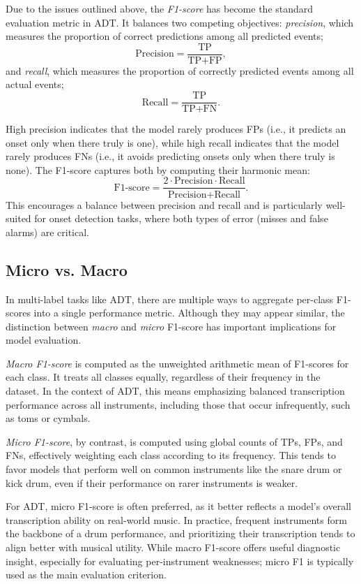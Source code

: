 Due to the issues outlined above, the \textit{F1-score} has become the standard evaluation metric in \gls{ADT}. It balances two competing objectives: \textit{precision}, which measures the proportion of correct predictions among all predicted events; \[ \text{Precision} = \frac{\text{TP}}{\text{TP} + \text{FP}},\] and \textit{recall}, which measures the proportion of correctly predicted events among all actual events; \[ \text{Recall} = \frac{\text{TP}}{\text{TP} + \text{FN}}. \]

High precision indicates that the model rarely produces \glspl{FP} (i.e., it predicts an onset only when there truly is one), while high recall indicates that the model rarely produces \glspl{FN} (i.e., it avoids predicting onsets only when there truly is none). The F1-score captures both by computing their harmonic mean: \[ \text{F1-score} = \frac{2 \cdot \text{Precision} \cdot \text{Recall}}{\text{Precision} + \text{Recall}}. \] This encourages a balance between precision and recall and is particularly well-suited for onset detection tasks, where both types of error (misses and false alarms) are critical.

\subsection{Micro vs. Macro}

In multi-label tasks like \gls{ADT}, there are multiple ways to aggregate per-class F1-scores into a single performance metric. Although they may appear similar, the distinction between \textit{macro} and \textit{micro} F1-score has important implications for model evaluation.

\textit{Macro F1-score} is computed as the unweighted arithmetic mean of F1-scores for each class. It treats all classes equally, regardless of their frequency in the dataset. In the context of \gls{ADT}, this means emphasizing balanced transcription performance across all instruments, including those that occur infrequently, such as toms or cymbals.

\textit{Micro F1-score}, by contrast, is computed using global counts of \glspl{TP}, \glspl{FP}, and \glspl{FN}, effectively weighting each class according to its frequency. This tends to favor models that perform well on common instruments like the snare drum or kick drum, even if their performance on rarer instruments is weaker.

For \gls{ADT}, micro F1-score is often preferred, as it better reflects a model's overall transcription ability on real-world music. In practice, frequent instruments form the backbone of a drum performance, and prioritizing their transcription tends to align better with musical utility. While macro F1-score offers useful diagnostic insight, especially for evaluating per-instrument weaknesses; micro F1 is typically used as the main evaluation criterion.

